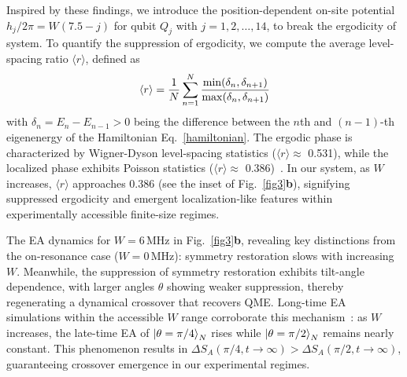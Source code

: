 \documentclass[reprint,superscriptaddress,preprintnumbers,longbibliography,
amsmath,amssymb,aps,floatfix,pra,twocolumn, tightenlines %
]{revtex4-2}
\begin{document}
    Inspired by these findings, we introduce the position-dependent on-site potential \(h_j/2\pi = W(7.5-j)\) for qubit \(Q_j\) with \(j = 1, 2, \ldots, 14\), to break the ergodicity of system. To quantify the suppression of ergodicity, we compute the average level-spacing ratio \(\langle r \rangle\), defined as~\cite{2013_PRL_Level_Ratio} 
    \begin{equation}
    \expval{r} = \frac{1}{N} \sum_{n=1}^N \frac{\min(\delta_n, \delta_{n+1})}{\max(\delta_n, \delta_{n+1})}
    \end{equation}
    with \(\delta_n = E_{n} - E_{n-1} > 0 \) being the difference between the \(n\)th and \((n-1)\)-th eigenenergy of the Hamiltonian Eq.~\eqref{hamiltonian}. The ergodic phase is characterized by Wigner-Dyson level-spacing statistics (\(\langle r \rangle \approx\) 0.531), while the localized phase exhibits Poisson statistics (\(\langle r \rangle \approx\) 0.386)~\cite{2019_PNAS_mbl,2020_PRB_mbl}. In our system, as \(W\) increases, \(\langle r \rangle \) approaches 0.386 (see the inset of Fig.~\ref{fig3}\textbf{b}), signifying suppressed ergodicity and emergent localization-like features within experimentally accessible finite-size regimes.
    
    The EA dynamics for \(W = 6 \, \text{MHz}\) in Fig.~\ref{fig3}\textbf{b}, revealing key distinctions from the on-resonance case (\(W = 0 \, \text{MHz}\)): symmetry restoration slows with increasing \(W\). Meanwhile, the suppression of symmetry restoration exhibits tilt-angle dependence, with larger angles $\theta$ showing weaker suppression, thereby regenerating a dynamical crossover that recovers QME. Long-time EA simulations within the accessible \(W\) range corroborate this mechanism~\cite{supp_cite}: as \(W\) increases, the late-time EA of \( \ket{\theta = \pi/4}_N \) rises while \( \ket{\theta = \pi/2}_N \) remains nearly constant. This phenomenon results in $\Delta S_A(\pi/4,t\to \infty)>\Delta S_A(\pi/2,t\to \infty)$, guaranteeing crossover emergence in our experimental regimes.
\end{document}
